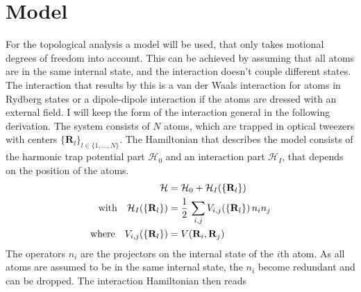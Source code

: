 \section{Model}\label{sec:model derivation}
For the topological analysis a model will be used, that only takes motional degrees of freedom into account. This can be achieved by assuming that all atoms are in the same internal state, and the interaction doesn't couple different states. The interaction that results by this is a van der Waals interaction for atoms in Rydberg states or a dipole-dipole interaction if the atoms are dressed with an external field. I will keep the form of the interaction general in the following derivation. The system consists of $N$ atoms, which are trapped in optical tweezers with centers $\{\mathbf{R}_l\}_{l\in\{1,\dots,N\}}$. The Hamiltonian that describes the model consists of the harmonic trap potential part $\mathcal{H}_0$ and an interaction part $\mathcal{H}_I$, that depends on the position of the atoms.
\begin{align*}
    \mathcal{H} &= \mathcal{H}_0 + \mathcal{H}_I(\{{\mathbf{R}}_l\})\\
    \text{with}\quad\mathcal{H}_I(\{{\mathbf{R}}_l\}) &= \frac{1}{2} \,\sum_{i,j}V_{i,j}(\{{\mathbf{R}}_l\})\,n_i n_j\\
    \text{where}\quad V_{i,j}(\{{\mathbf{R}}_l\})&=V({\mathbf{R}}_i,{\mathbf{R}}_j)
\end{align*}
The operators $n_i$ are the projectors on the internal state of the $i$th atom. As all atoms are assumed to be in the same internal state, the $n_i$ become redundant and can be dropped. The interaction Hamiltonian then reads


